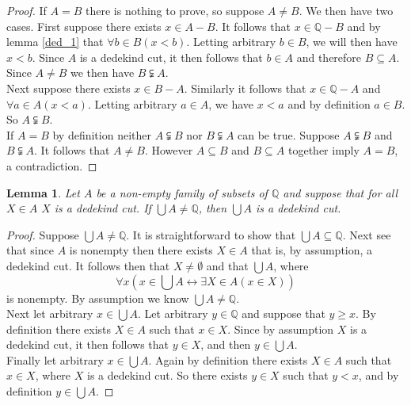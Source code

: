 \documentclass{report}
\newtheorem{lemma}[theo]{Lemma}
\begin{document}
\begin{proof}
If $A=B$ there is nothing to prove, so suppose $A\neq B$. We then have two cases. First suppose there exists $x\in A-B$. It follows that $x\in\mathbb Q-B$ and by lemma \ref{ded_1} 
that $\forall b\in B(x<b)$. Letting arbitrary $b\in B$, we will then have $x<b$. Since $A$ is a dedekind cut, it then follows that $b\in A$ and therefore $B\subseteq A$. Since $A\neq B$ we then have
$B\subsetneqq A$.\\
\indent Next suppose there exists $x\in B-A$. Similarly it follows that $x\in\mathbb Q-A$ and $\forall a\in A(x<a)$. Letting arbitrary $a\in A$, we have $x<a$ and by definition $a\in B$. So $A\subsetneqq B$.\\
\indent If $A=B$ by definition neither $A\subsetneqq B$ nor $B\subsetneqq A$ can be true.
Suppose $A\subsetneqq B$ and $B\subsetneqq A$. It follows that $A\neq B$. However $A\subseteq B$ and $B\subseteq A$ together imply $A=B$, a contradiction.
\end{proof}
\begin{lemma}
Let $A$ be a non-empty family of subsets of $\mathbb Q$ and suppose that for all $X\in A$ $X$ is a dedekind cut. If $\bigcup A\neq\mathbb Q$, then $\bigcup A$ is a dedekind cut.
\end{lemma}
\begin{proof}
Suppose $\bigcup A\neq\mathbb Q$. It is straightforward to show that $\bigcup A\subseteq\mathbb Q$.
Next see that since $A$ is nonempty then there exists $X\in A$ that is, by assumption, a dedekind cut. It follows then that $X\neq\emptyset$ and
that $\bigcup A$, where
\begin{equation*}
\forall x(x\in\bigcup A\leftrightarrow\exists X\in A(x\in X))
\end{equation*}
is nonempty. By assumption we know $\bigcup A\neq\mathbb Q$.\\
\indent Next let arbitrary $x\in\bigcup A$. Let arbitrary $y\in\mathbb Q$ and suppose that $y\geq x$. By definition there exists $X\in A$ such that $x\in X$. Since by assumption 
$X$ is a dedekind cut, it then follows that $y\in X$, and then $y\in\bigcup A$.\\
\indent Finally let arbitrary $x\in\bigcup A$. Again by definition there exists $X\in A$ such that $x\in X$, where $X$ is a dedekind cut. So there exists $y\in X$ such that $y<x$,
and by definition $y\in\bigcup A$.
\end{proof}
\newpage
\end{document}
